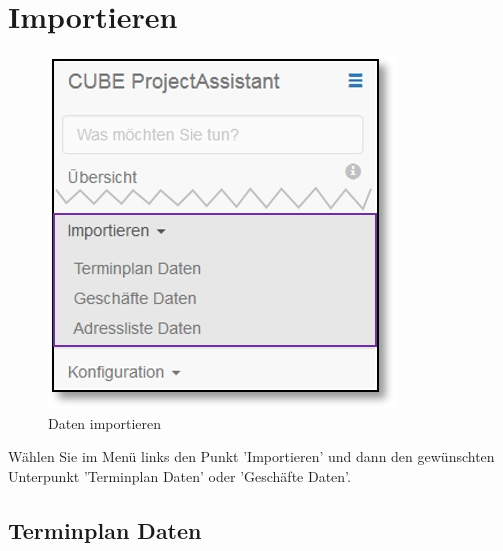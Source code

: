 
\clearpage
\section{Importieren}

\begin{figure}   %
  \vspace{-35pt}      %
  \begin{center}
    \includegraphics[width=1\linewidth]{../chapters/12_Importieren/pictures/12_Menu_Importieren.jpg}
  \end{center}
  \vspace{-20pt}
  \caption{Daten importieren}
  \vspace{-10pt}
\end{figure}

Wählen Sie im Menü links den Punkt 'Importieren' und dann den gewünschten Unterpunkt 'Terminplan Daten' oder 'Geschäfte Daten'.

\vspace{6.5cm}

\subsection{Terminplan Daten}
\label{bkm:Ref445411998}

